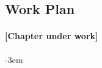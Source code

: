 \begin{landscape}

\chapter{Work Plan} %

\label{Chapter:WorkPlan}

\subsubsection*{\color{mygray}[Chapter under work]}

\leftskip-3em

\begin{gantt}{7}{24}
\begin{ganttitle}
\end{ganttitle}

\begin{ganttitle}
\end{ganttitle}


\end{gantt}

\end{landscape}






